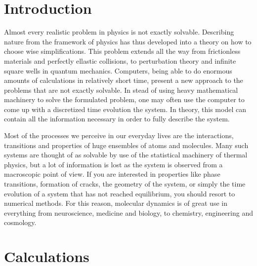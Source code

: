 \documentclass[twoside,utf8]{article}
\begin{document}
\begin{multicols}{2}

\section{Introduction}
Almost every realistic problem in physics is not exactly solvable. Describing nature from the framework of physics has thus developed into a theory on how to choose wise simplifications. This problem extends all the way from frictionless materials and perfectly ellastic collisions, to perturbation theory and infinite square wells in quantum mechanics. Computers, being able to do enormous amounts of calculations in relatively short time, present a new approach to the problems that are not exactly solvable. In stead of using heavy mathematical machinery to solve the formulated problem, one may often use the computer to come up with a discretized time evolution the system. In theory, this model can contain all the information necessary in order to fully describe the system.

Most of the processes we perceive in our everyday lives are the interactions, transitions and properties of huge ensembles of atoms and molecules. Many such systems are thought of as solvable by use of the statistical machinery of thermal physics, but a lot of information is lost as the system is observed from a macroscopic point of view. If you are interested in properties like phase transitions, formation of cracks, the geometry of the system, or simply the time evolution of a system that has not reached equilibrium, you should resort to numerical methods. For this reason, molecular dynamics is of great use in everything from neuroscience, medicine and biology, to chemistry, engineering and cosmology.



\section{Calculations}

\end{multicols}
\end{document}
